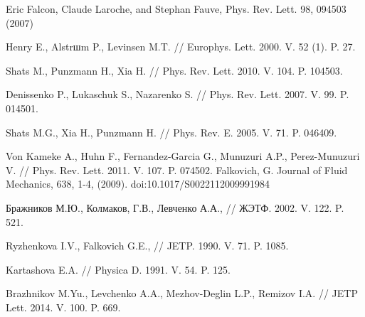 \begin{thebibliography}{99}
Eric Falcon, Claude Laroche, and Stephan Fauve,%
Phys. Rev. Lett. 98, 094503 (2007)

Henry E., Alstrшm P., Levinsen M.T. // Europhys. Lett. 2000. V. 52 (1). P. 27.

Shats M., Punzmann H., Xia H. // Phys. Rev. Lett. 2010. V. 104. P. 104503.

Denissenko P., Lukaschuk S., Nazarenko S. // Phys. Rev. Lett. 2007. V. 99. P. 014501.

Shats M.G., Xia H., Punzmann H. // Phys. Rev. E. 2005. V. 71. P. 046409.

Von Kameke A., Huhn F., Fernandez-Garcia G., Munuzuri A.P., Perez-Munuzuri V. // Phys. Rev. Lett. 2011. V. 107. P. 074502.
Falkovich, G.
Journal of Fluid Mechanics, 638, 1-4, (2009). doi:10.1017/S0022112009991984


Бражников М.Ю., Колмаков, Г.В., Левченко А.А.,
// ЖЭТФ. 2002. V. 122. P. 521.

Ryzhenkova I.V., Falkovich G.E., 
// JETP. 1990. V. 71. P. 1085.



Kartashova E.A. // Physica D. 1991. V. 54. P. 125.

Brazhnikov M.Yu., Levchenko A.A., Mezhov-Deglin L.P., Remizov I.A. // JETP Lett. 2014. V. 100. P. 669.


\end{thebibliography}
